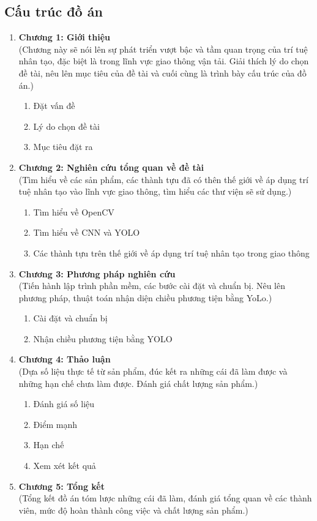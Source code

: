 \documentclass[14pt,oneside,a4paper]{extreport}
\begin{document}
\subsection{Cấu trúc đồ án}
\renewcommand{\labelenumi}{}
\renewcommand{\labelenumii}{\arabic{enumi}.\arabic{enumii}.}
\large
\begin{enumerate}
	\item \textbf{Chương 1: Giới thiệu}\\
	(Chương này sẽ nói lên sự phát triển vượt bậc và tầm quan trọng của trí tuệ nhân tạo, đặc biệt là trong lĩnh vực giao thông vận tải. Giải thích lý do chọn đề tài, nêu lên mục tiêu của đề tài và cuối cùng là trình bày cấu trúc của đồ án.)
	\begin{enumerate}
		\item Đặt vấn đề
		\item Lý do chọn đề tài 
		\item Mục tiêu đặt ra
	\end{enumerate}
	\item \textbf{Chương 2: Nghiên cứu tổng quan về đề tài}\\
	(Tìm hiểu về các sản phẩm, các thành tựu đã có thên thế giới về áp dụng trí tuệ nhân tạo vào lĩnh vực giao thông, tìm hiểu các thư viện sẽ sử dụng.)
	\begin{enumerate}
		\item Tìm hiểu về OpenCV
		\item Tìm hiểu về CNN và YOLO
		\item Các thành tựu trên thế giới về áp dụng trí tuệ nhân tạo trong giao thông
	\end{enumerate}
	\item \textbf{Chương 3: Phương pháp nghiên cứu}\\
	(Tiến hành lập trình phần mềm, các bước cài đặt và chuẩn bị. Nêu lên phương pháp, thuật toán nhận diện chiều phương tiện bằng YoLo.)
	\begin{enumerate}
		\item Cài đặt và chuẩn bị
		\item Nhận chiều phương tiện bằng YOLO
	\end{enumerate}
	\item \textbf{Chương 4: Thảo luận}\\
	(Dựa số liệu thực tế từ sản phẩm, đúc kết ra những cái đã làm được và những hạn chế chưa làm được. Đánh giá chất lượng sản phẩm.) 
	\begin{enumerate}
		\item Đánh giá số liệu
		\item Điểm mạnh
		\item Hạn chế
		\item Xem xét kết quả
	\end{enumerate}
	\item \textbf{Chương 5: Tổng kết}\\
	(Tổng kết đồ án tóm lược những cái đã làm, đánh giá tổng quan về các thành viên, mức độ hoàn thành công việc và chất lượng sản phẩm.)
\end{enumerate}
\end{document}
